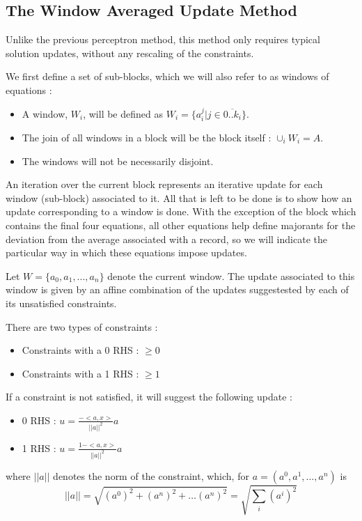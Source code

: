 \documentclass[a4paper,twoside,10pt]{report}
\begin{document}
\clearpage	

	\subsection{The Window Averaged Update Method}
	
	Unlike the previous perceptron method, this method only requires typical solution updates, without any rescaling of the constraints.
	
	We first define a set of sub-blocks, which we will also refer to as windows of equations : 
	
	\begin{itemize}
		\item A window, \(W_i\), will be defined as \(W_i = \{a_i^j | j\in \overline{0..k_i}\}\).
		\item The join of all windows in a block will be the block itself : \(\cup_{i} W_i = A\).
		\item The windows will not be necessarily disjoint.
	\end{itemize}
	
	An iteration over the current block represents an iterative update for each window (sub-block) associated to it. All that is left to be done is 
to show how an update corresponding to a window is done. With the exception of the block which contains the final four equations, all other equations
help define majorants for the deviation from the average associated with a record, so we will indicate the particular way in which these equations impose updates.

	Let \(W = \{a_0, a_1, ..., a_n\}\) denote the current window.  The update associated to this window is given by an affine combination of the updates suggestested 
by each of its unsatisfied constraints.
	
	There are two types of constraints : 
	
	\begin{itemize}
		\item Constraints with a 0 RHS : \(<a,x> \geq 0\)
		\item Constraints with a 1 RHS : \(<a,x> \geq 1\)
	\end{itemize}
	
	If a constraint is not satisfied, it will suggest the following update :
	\begin{itemize}
		\item 0 RHS : \(u = \frac{-<a,x>}{||a||^2}a\)
		\item 1 RHS : \(u = \frac{1 - <a,x>}{||a||^2}a\)
	\end{itemize}	
	where \(||a||\) denotes the norm of the constraint, which, for \(a = (a^0, a^1, \ldots, a^n)\) is 
	\[
		||a|| = \sqrt{(a^0)^2 + (a^n)^2 + \ldots (a^n)^2} = \sqrt{\sum_i {(a^i)^2}}
	\]
	
\end{document}
